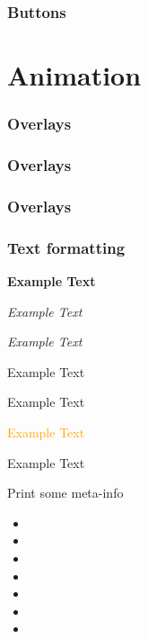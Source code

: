 \documentclass{beamer}
\begin{document}
\begin{frame}
	\frametitle{Buttons}
	\hyperlink{contents}{}
	\hyperlink{contents}{}
	\hyperlink{contents}{}
	\hyperlink{contents}{}
\end{frame}



\section{Animation}


\begin{frame}
	\frametitle{Overlays}


\end{frame}

\begin{frame}
	\frametitle{Overlays}


\end{frame}

\begin{frame}
	\frametitle{Overlays}


\end{frame}


\begin{frame}
	\frametitle{Text formatting}
	\textbf<2>{Example Text}

	\textit<2>{Example Text}

	\textsl<2>{Example Text}

	\textrm<2>{Example Text}

	\textsf<2>{Example Text}

	\textcolor<2>{orange}{Example Text}

	\alert<2>{Example Text}

\end{frame}

\begin{frame}{Print some meta-info}
	\begin{itemize}
		\item \insertframenumber
		\item \insertauthor
		\item \insertinstitute
		\item \insertshortauthor
		\item \insertshortinstitute
		\item \inserttitle
		\item \insertshorttitle
	\end{itemize}
\end{frame}
\end{document}
